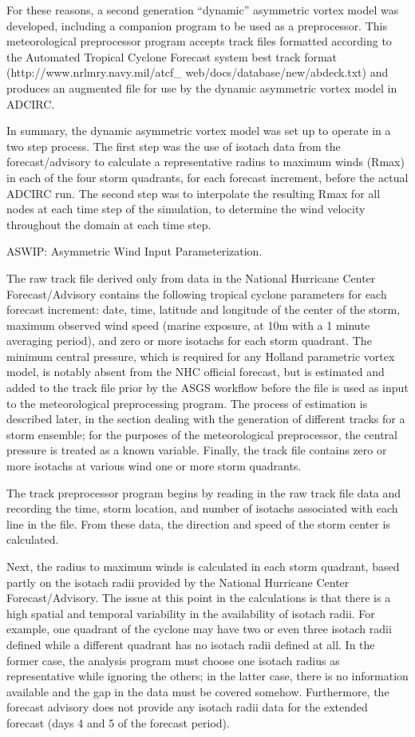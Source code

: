 \documentclass[jmse,article,submit,moreauthors,pdftex,12pt,a4paper]{mdpi}
\begin{document}
For these reasons, a second generation ``dynamic'' asymmetric vortex 
model was developed, including a companion program to be used as a 
preprocessor. This meteorological preprocessor program accepts track 
files formatted according to the Automated Tropical Cyclone Forecast 
system best track format (http://www.nrlmry.navy.mil/atcf\_ 
web/docs/database/new/abdeck.txt) and produces an augmented file for 
use by the dynamic asymmetric vortex model in ADCIRC. 

In summary, the dynamic asymmetric vortex model was set up to 
operate in a two step process. The first step was the use of isotach 
data from the forecast/advisory to calculate a representative radius 
to maximum winds (Rmax) in each of the four storm quadrants, for 
each forecast increment, before the actual ADCIRC run. The second 
step was to interpolate the resulting Rmax for all nodes at each 
time step of the simulation, to determine the wind velocity 
throughout the domain at each time step.

ASWIP: Asymmetric Wind Input Parameterization.

The raw track file derived only from data in the National Hurricane 
Center Forecast/Advisory contains the following tropical cyclone 
parameters for each forecast increment: date, time, latitude and 
longitude of the center of the storm, maximum observed wind speed 
(marine exposure, at 10m with a 1 minute averaging period), and zero 
or more isotachs for each storm quadrant. The minimum central 
pressure, which is required for any Holland parametric vortex model, 
is notably absent from the NHC official forecast, but is estimated 
and added to the track file prior by the ASGS workflow before the 
file is used as input to the meteorological preprocessing program. 
The process of estimation is described later, in the section dealing 
with the generation of different tracks for a storm ensemble; for 
the purposes of the meteorological preprocessor, the central 
pressure is treated as a known variable. Finally, the track file 
contains zero or more isotachs at various wind one or more storm 
quadrants.

The track preprocessor program begins by reading in the raw track file
data and recording the time, storm location, and number of isotachs
associated with each line in the file. From these data, the direction
and speed of the storm center is calculated.

Next, the radius to maximum winds is calculated in each storm 
quadrant, based partly on the isotach radii provided by the National 
Hurricane Center Forecast/Advisory. The issue at this point in the 
calculations is that there is a high spatial and temporal 
variability in the availability of isotach radii. For example, one 
quadrant of the cyclone may have two or even three isotach radii 
defined while a different quadrant has no isotach radii defined at 
all. In the former case, the analysis program must choose one 
isotach radius as representative while ignoring the others; in the 
latter case, there is no information available and the gap in the 
data must be covered somehow. Furthermore, the forecast advisory
does not provide any isotach radii data for the extended forecast
(days 4 and 5 of the forecast period).
\end{document}
